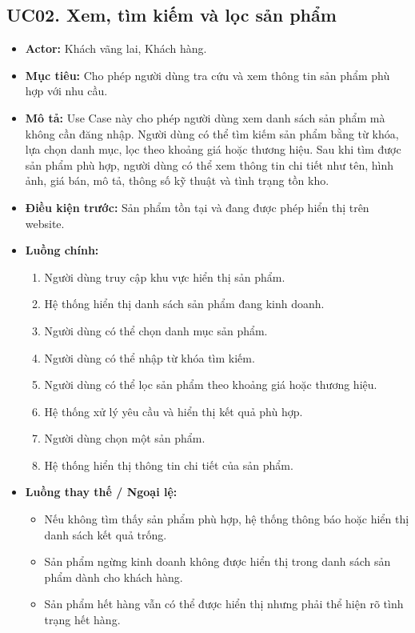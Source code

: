 \documentclass[12pt,a4paper]{article}
\begin{document}
\subsection*{UC02. Xem, tìm kiếm và lọc sản phẩm}

\begin{itemize}

    \item \textbf{Actor:} Khách vãng lai, Khách hàng.

    \item \textbf{Mục tiêu:} Cho phép người dùng tra cứu và xem thông tin sản phẩm phù hợp với nhu cầu.

    \item \textbf{Mô tả:} Use Case này cho phép người dùng xem danh sách sản phẩm mà không cần đăng nhập. Người dùng có thể tìm kiếm sản phẩm bằng từ khóa, lựa chọn danh mục, lọc theo khoảng giá hoặc thương hiệu. Sau khi tìm được sản phẩm phù hợp, người dùng có thể xem thông tin chi tiết như tên, hình ảnh, giá bán, mô tả, thông số kỹ thuật và tình trạng tồn kho.

    \item \textbf{Điều kiện trước:} Sản phẩm tồn tại và đang được phép hiển thị trên website.

    \item \textbf{Luồng chính:}
    \begin{enumerate}
        \item Người dùng truy cập khu vực hiển thị sản phẩm.
        \item Hệ thống hiển thị danh sách sản phẩm đang kinh doanh.
        \item Người dùng có thể chọn danh mục sản phẩm.
        \item Người dùng có thể nhập từ khóa tìm kiếm.
        \item Người dùng có thể lọc sản phẩm theo khoảng giá hoặc thương hiệu.
        \item Hệ thống xử lý yêu cầu và hiển thị kết quả phù hợp.
        \item Người dùng chọn một sản phẩm.
        \item Hệ thống hiển thị thông tin chi tiết của sản phẩm.
    \end{enumerate}

    \item \textbf{Luồng thay thế / Ngoại lệ:}
    \begin{itemize}
        \item Nếu không tìm thấy sản phẩm phù hợp, hệ thống thông báo hoặc hiển thị danh sách kết quả trống.
        \item Sản phẩm ngừng kinh doanh không được hiển thị trong danh sách sản phẩm dành cho khách hàng.
        \item Sản phẩm hết hàng vẫn có thể được hiển thị nhưng phải thể hiện rõ tình trạng hết hàng.
    \end{itemize}


\end{itemize}
\end{document}
